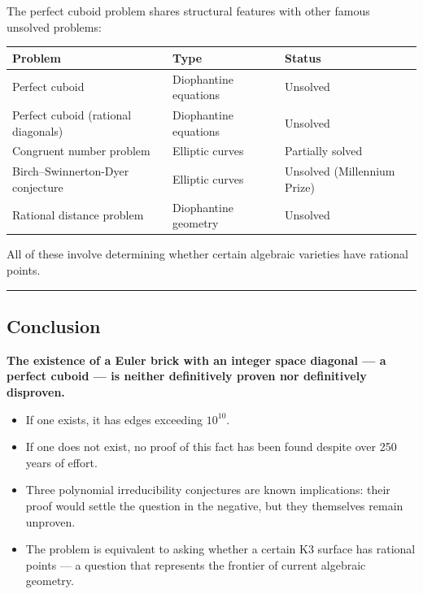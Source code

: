 \documentclass[10pt,a4paper]{article}
\begin{document}
The perfect cuboid problem shares structural features with other famous unsolved problems:

\begin{table}[htbp]
\centering
\small
{}
\begin{tabularx}{\textwidth}{>{\centering\arraybackslash}X >{\centering\arraybackslash}X >{\centering\arraybackslash}X}
\toprule
\rowcolor{gray!25}\textbf{Problem} & \textbf{Type} & \textbf{Status} \\
\midrule
\rowcolors{1}{white}{gray!10}
Perfect cuboid & Diophantine equations & Unsolved \\
Perfect cuboid (rational diagonals) & Diophantine equations & Unsolved \\
Congruent number problem & Elliptic curves & Partially solved \\
Birch--Swinnerton-Dyer conjecture & Elliptic curves & Unsolved (Millennium Prize) \\
Rational distance problem & Diophantine geometry & Unsolved \\
\bottomrule
\end{tabularx}
\end{table}

All of these involve determining whether certain algebraic varieties have rational points.

\begin{center}
\rule{0.5\textwidth}{0.4pt}
\end{center}

\subsection{Conclusion}

\textbf{The existence of a Euler brick with an integer space diagonal --- a perfect cuboid --- is neither definitively proven nor definitively disproven.}

\begin{itemize}
    \item If one exists, it has edges exceeding $10^{10}$.
    \item If one does not exist, no proof of this fact has been found despite over 250 years of effort.
    \item Three polynomial irreducibility conjectures are known implications: their proof would settle the question in the negative, but they themselves remain unproven.
    \item The problem is equivalent to asking whether a certain K3 surface has rational points --- a question that represents the frontier of current algebraic geometry.
\end{itemize}
\end{document}
